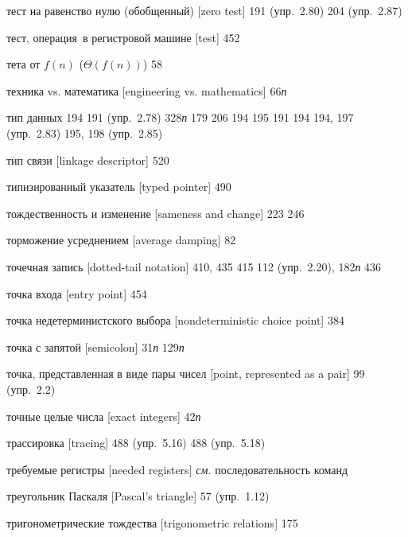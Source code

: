 \begin{theindex}
\item {тест на равенство нулю (обобщенный) [zero test]} 191 (упр.~2.80)
   204 (упр.~2.87)
\item {тест, операция~в регистровой машине [test]} 452
\item {тета от $f(n)$ ($\Theta(f(n))$)} 58
\item {техника vs. математика [engineering vs. mathematics]} 66{\it п}
\item {тип данных}
   194
   191 (упр.~2.78)
   328{\it п}
   179
   206
   194
   195
   191
   194
   194, 197 (упр.~2.83)
   195, 198 (упр.~2.85)
\item {тип связи [linkage descriptor]} 520
\item {типизированный указатель [typed pointer]} 490
\item {тождественность и изменение [sameness and change]}
   223
   246
\item {торможение усреднением [average damping]} 82
\item {точечная запись [dotted-tail notation]}
   410, 435
   415
   112 (упр.~2.20), 182{\it п}
   436
\item {точка входа [entry point]} 454
\item {точка недетерминистского выбора [nondeterministic choice point]} 384
\item {точка с запятой [semicolon]} 31{\it п}
   129{\it п}
\item {точка, представленная в виде пары чисел [point, represented as a pair]} 99 (упр.~2.2)
\item {точные целые числа [exact integers]} 42{\it п}
\item {трассировка [tracing]}
   488 (упр.~5.16)
   488 (упр.~5.18)
\item {требуемые регистры [needed registers]} {\it см.} последовательность команд
\item {треугольник Паскаля [Pascal's triangle]} 57 (упр.~1.12)
\item {тригонометрические тождества [trigonometric relations]} 175

\end{theindex}
